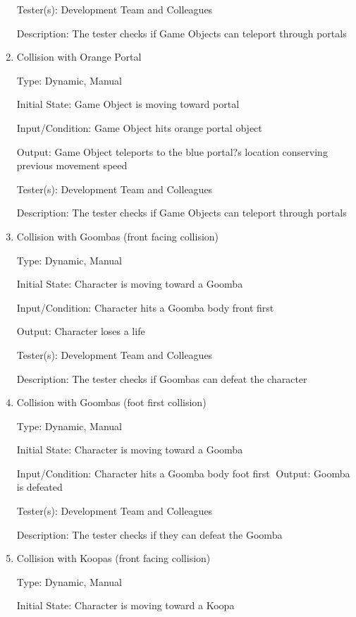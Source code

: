 \documentclass[12pt, titlepage]{article}
\begin{document}
\begin{enumerate}
Tester(s): Development Team and Colleagues

Description: The tester checks if Game Objects can teleport through portals


\item{Collision with Orange Portal\\}

Type: Dynamic, Manual

Initial State: Game Object is moving toward portal

Input/Condition: Game Object hits orange portal object

Output: Game Object teleports to the blue portal?s location conserving previous movement speed

Tester(s): Development Team and Colleagues

Description: The tester checks if Game Objects can teleport through portals


\item{Collision with Goombas (front facing collision)\\}

Type: Dynamic, Manual

Initial State: Character is moving toward a Goomba

Input/Condition: Character hits a Goomba body front first

Output: Character loses a life

Tester(s): Development Team and Colleagues

Description: The tester checks if Goombas can defeat the character


\item{Collision with Goombas (foot first collision)\\}

Type: Dynamic, Manual

Initial State: Character is moving toward a Goomba

Input/Condition: Character hits a Goomba body foot first
Output: Goomba is defeated

Tester(s): Development Team and Colleagues

Description: The tester checks if they can defeat the Goomba


\item{Collision with Koopas (front facing collision)\\}

Type: Dynamic, Manual

Initial State: Character is moving toward a Koopa


\end{enumerate}
\end{document}
